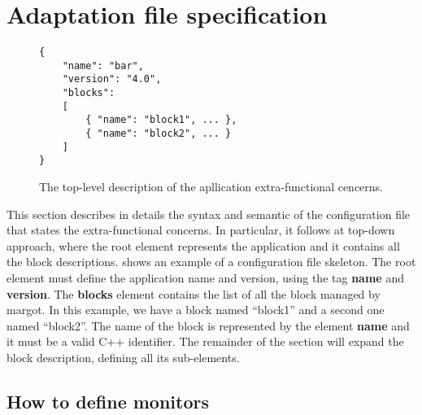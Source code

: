 \section{Adaptation file specification}
\label{sec:adaptation}

\begin{figure}
\lstset{language=json}
\begin{lstlisting}
{
	"name": "bar",
	"version": "4.0",
	"blocks":
	[
		{ "name": "block1", ... },
		{ "name": "block2", ... }
	]
}
\end{lstlisting}
\caption{The top-level description of the apllication extra-functional cencerns.}
\label{code:min_adaptation}
\end{figure}

This section describes in details the syntax and semantic of the configuration file that states the extra-functional concerns.
In particular, it follows at top-down approach, where the root element represents the application and it contains all the block descriptions.
 shows an example of a configuration file skeleton.
The root element must define the application name and version, using the tag \textbf{name} and \textbf{version}.
The \textbf{blocks} element contains the list of all the block managed by margot.
In this example, we have a block named ``block1'' and a second one named ``block2''.
The name of the block is represented by the element \textbf{name} and it must be a valid C++ identifier.
The remainder of the section will expand the block description, defining all its sub-elements.



\subsection{How to define monitors}
\label{ssec:monitor_element}


